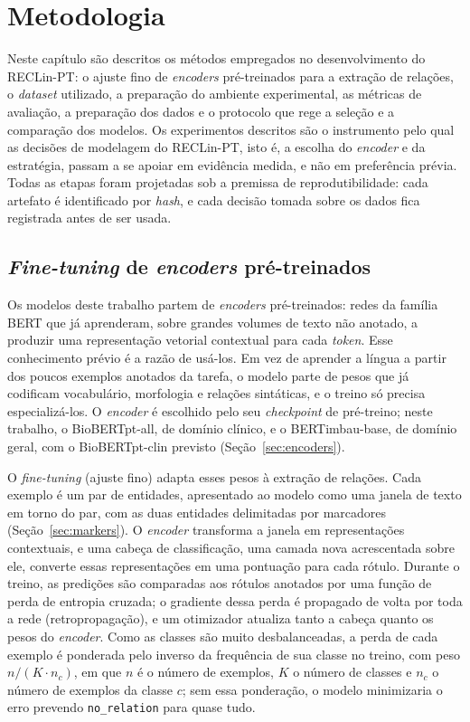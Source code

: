 \chapter[Metodologia]{Metodologia}
\label{cap:metodologia}

Neste capítulo são descritos os métodos empregados no desenvolvimento do RECLin-PT:
o ajuste fino de \emph{encoders} pré-treinados para a extração de relações, o
\emph{dataset} utilizado, a preparação do ambiente experimental, as métricas de
avaliação, a preparação dos dados e o protocolo que rege a seleção e a comparação
dos modelos. Os experimentos descritos são o instrumento pelo qual as decisões de
modelagem do RECLin-PT, isto é, a escolha do \emph{encoder} e da estratégia, passam
a se apoiar em evidência medida, e não em preferência prévia. Todas as etapas foram
projetadas sob a premissa de
reprodutibilidade: cada artefato é identificado por \emph{hash}, e cada
decisão tomada sobre os dados fica registrada antes de ser usada.

\section{\emph{Fine-tuning} de \emph{encoders} pré-treinados}
\label{sec:finetuning}

Os modelos deste trabalho partem de \emph{encoders} pré-treinados: redes da
família BERT \cite{devlin_2019_bert} que já aprenderam, sobre grandes volumes de texto
não anotado, a produzir uma representação vetorial contextual para cada
\emph{token}. Esse conhecimento prévio é a razão de usá-los. Em vez de aprender a
língua a partir dos poucos exemplos anotados da tarefa, o modelo parte de pesos que
já codificam vocabulário, morfologia e relações sintáticas, e o treino só precisa
especializá-los. O \emph{encoder} é escolhido pelo seu \emph{checkpoint} de
pré-treino; neste trabalho, o BioBERTpt-all, de domínio clínico, e o BERTimbau-base,
de domínio geral, com o BioBERTpt-clin previsto (Seção~\ref{sec:encoders}).

O \emph{fine-tuning} (ajuste fino) adapta esses pesos à extração de relações.
Cada exemplo é um par de entidades, apresentado ao modelo como uma janela de texto em
torno do par, com as duas entidades delimitadas por marcadores
(Seção~\ref{sec:markers}). O \emph{encoder} transforma a janela em representações
contextuais, e uma cabeça de classificação, uma camada nova acrescentada
sobre ele, converte essas representações em uma pontuação para cada rótulo. Durante o
treino, as predições são comparadas aos rótulos anotados por uma função de perda de
entropia cruzada; o gradiente dessa perda é propagado de volta por toda a rede
(retropropagação), e um otimizador atualiza tanto a cabeça quanto os pesos do
\emph{encoder}. Como as classes são muito desbalanceadas, a perda de cada exemplo é
ponderada pelo inverso da frequência de sua classe no treino, com peso
$n/(K\cdot n_c)$, em que $n$ é o número de exemplos, $K$ o número de classes e $n_c$
o número de exemplos da classe $c$; sem essa ponderação, o modelo minimizaria o erro
prevendo \texttt{no\_relation} para quase tudo.

